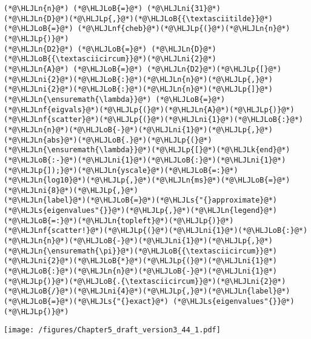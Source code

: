 \documentclass[12pt,landscape]{article}
\newcommand{\HLJLk}[1]{\textcolor[RGB]{148,91,176}{\textbf{#1}}}
\newcommand{\HLJLn}[1]{#1}
\newcommand{\HLJLnf}[1]{\textcolor[RGB]{66,102,213}{#1}}
\newcommand{\HLJLs}[1]{\textcolor[RGB]{201,61,57}{#1}}
\newcommand{\HLJLni}[1]{\textcolor[RGB]{59,151,46}{#1}}
\newcommand{\HLJLoB}[1]{\textcolor[RGB]{102,102,102}{\textbf{#1}}}
\newcommand{\HLJLp}[1]{#1}
\begin{document}
{\begin{lstlisting}
(*@\HLJLn{n}@*) (*@\HLJLoB{=}@*) (*@\HLJLni{31}@*)
(*@\HLJLn{D}@*)(*@\HLJLp{,}@*)(*@\HLJLoB{{\textasciitilde}}@*) (*@\HLJLoB{=}@*) (*@\HLJLnf{cheb}@*)(*@\HLJLp{(}@*)(*@\HLJLn{n}@*)(*@\HLJLp{)}@*)
(*@\HLJLn{D2}@*) (*@\HLJLoB{=}@*) (*@\HLJLn{D}@*)(*@\HLJLoB{{\textasciicircum}}@*)(*@\HLJLni{2}@*)
(*@\HLJLn{A}@*) (*@\HLJLoB{=}@*) (*@\HLJLn{D2}@*)(*@\HLJLp{[}@*)(*@\HLJLni{2}@*)(*@\HLJLoB{:}@*)(*@\HLJLn{n}@*)(*@\HLJLp{,}@*)(*@\HLJLni{2}@*)(*@\HLJLoB{:}@*)(*@\HLJLn{n}@*)(*@\HLJLp{]}@*)
(*@\HLJLn{\ensuremath{\lambda}}@*) (*@\HLJLoB{=}@*) (*@\HLJLnf{eigvals}@*)(*@\HLJLp{(}@*)(*@\HLJLn{A}@*)(*@\HLJLp{)}@*)
(*@\HLJLnf{scatter}@*)(*@\HLJLp{(}@*)(*@\HLJLni{1}@*)(*@\HLJLoB{:}@*)(*@\HLJLn{n}@*)(*@\HLJLoB{-}@*)(*@\HLJLni{1}@*)(*@\HLJLp{,}@*)(*@\HLJLn{abs}@*)(*@\HLJLoB{.}@*)(*@\HLJLp{(}@*)(*@\HLJLn{\ensuremath{\lambda}}@*)(*@\HLJLp{[}@*)(*@\HLJLk{end}@*)(*@\HLJLoB{:-}@*)(*@\HLJLni{1}@*)(*@\HLJLoB{:}@*)(*@\HLJLni{1}@*)(*@\HLJLp{]);}@*)(*@\HLJLn{yscale}@*)(*@\HLJLoB{=:}@*)(*@\HLJLn{log10}@*)(*@\HLJLp{,}@*)(*@\HLJLn{ms}@*)(*@\HLJLoB{=}@*)(*@\HLJLni{8}@*)(*@\HLJLp{,}@*)
(*@\HLJLn{label}@*)(*@\HLJLoB{=}@*)(*@\HLJLs{"{}approximate}@*) (*@\HLJLs{eigenvalues"{}}@*)(*@\HLJLp{,}@*)(*@\HLJLn{legend}@*)(*@\HLJLoB{=:}@*)(*@\HLJLn{topleft}@*)(*@\HLJLp{)}@*)
(*@\HLJLnf{scatter!}@*)(*@\HLJLp{(}@*)(*@\HLJLni{1}@*)(*@\HLJLoB{:}@*)(*@\HLJLn{n}@*)(*@\HLJLoB{-}@*)(*@\HLJLni{1}@*)(*@\HLJLp{,}@*)(*@\HLJLn{\ensuremath{\pi}}@*)(*@\HLJLoB{{\textasciicircum}}@*)(*@\HLJLni{2}@*)(*@\HLJLoB{*}@*)(*@\HLJLp{(}@*)(*@\HLJLni{1}@*)(*@\HLJLoB{:}@*)(*@\HLJLn{n}@*)(*@\HLJLoB{-}@*)(*@\HLJLni{1}@*)(*@\HLJLp{)}@*)(*@\HLJLoB{.{\textasciicircum}}@*)(*@\HLJLni{2}@*)(*@\HLJLoB{/}@*)(*@\HLJLni{4}@*)(*@\HLJLp{,}@*)(*@\HLJLn{label}@*)(*@\HLJLoB{=}@*)(*@\HLJLs{"{}exact}@*) (*@\HLJLs{eigenvalues"{}}@*)(*@\HLJLp{)}@*)
\end{lstlisting}

\texttt{[image: /figures/Chapter5\_draft\_version3\_44\_1.pdf]}

}
\end{document}
